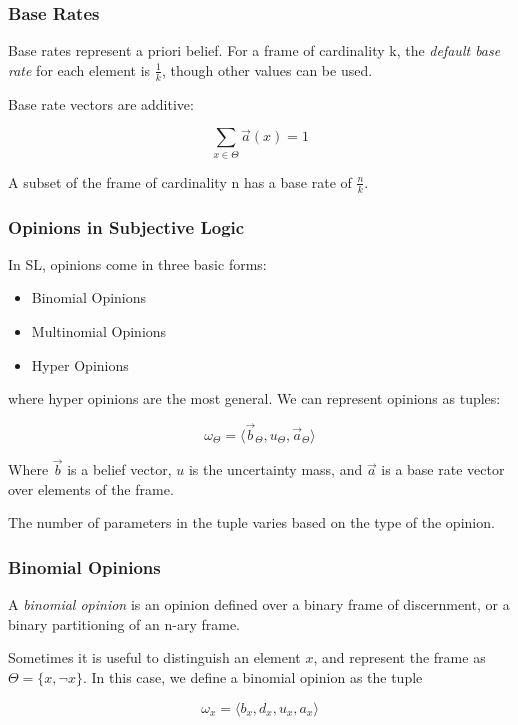 \documentclass{beamer}
\begin{document}

\begin{frame}
\frametitle{Base Rates}

Base rates represent a priori belief. For a frame of cardinality k, the
\emph{default base rate} for each element is $\frac{1}{k}$, though other values
can be used.

Base rate vectors are additive:

$$
\sum_{x \in \Theta} \vec{a}\left(x\right) = 1
$$

A subset of the frame of cardinality n has a base rate of $\frac{n}{k}$.

\end{frame}


\begin{frame}
\frametitle{Opinions in Subjective Logic}

In SL, opinions come in three basic forms:

\begin{itemize}
  \item Binomial Opinions
  \item Multinomial Opinions
  \item Hyper Opinions
\end{itemize}

where hyper opinions are the most general. We can represent opinions as tuples:

$$
\omega_\Theta = \langle \vec{b}_\Theta, u_\Theta, \vec{a}_\Theta \rangle
$$

Where $\vec{b}$ is a belief vector,
$u$ is the uncertainty mass, and
$\vec{a}$ is a base rate vector over elements of the frame.

The number of parameters in the tuple varies based on the type of the opinion.

\end{frame}



\begin{frame}
\frametitle{Binomial Opinions}

A \emph{binomial opinion} is an opinion defined over a binary frame of discernment, or
a binary partitioning of an n-ary frame.

Sometimes it is useful to distinguish an element $x$, and represent the frame as
$\Theta = \lbrace x, \lnot x \rbrace$. In this case, we define a binomial opinion as
the tuple

$$
\omega_x = \langle b_x, d_x, u_x, a_x \rangle
$$


\end{frame}
\end{document}
